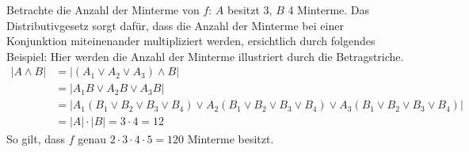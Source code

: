 \documentclass[a4paper,10pt]{article}
\begin{document}
\begin{enumerate}[a)]
Betrachte die Anzahl der Minterme von $f$: $A$ besitzt 3, $B$ 4 Minterme. Das Distributivgesetz sorgt dafür, dass die Anzahl der Minterme bei einer Konjunktion miteinenander multipliziert werden, ersichtlich durch folgendes Beispiel: Hier werden die Anzahl der Minterme illustriert durch die Betragstriche.
\begin{align*}
|A \wedge B| &= |\left(A_1 \vee A_2 \vee A_3\right) \wedge B|\\
&= |A_1B \vee A_2B \vee A_3B|\\
&= |A_1(B_1\vee B_2 \vee B_3 \vee B_4) \vee A_2(B_1\vee B_2 \vee B_3 \vee B_4) \vee A_3(B_1\vee B_2 \vee B_3 \vee B_4)|\\
&= |A| \cdot |B| = 3 \cdot 4 = 12
\end{align*}
So gilt, dass $f$ genau $2\cdot3\cdot4\cdot5=120$ Minterme besitzt. 

\end{enumerate}
\end{document}
